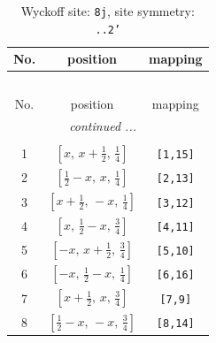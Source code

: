 \documentclass[fleqn,8pt]{jsarticle}
\begin{document}
\begin{longtable}{ccc}
\caption{Wyckoff site: {\tt 8j}, site symmetry: {\tt ..2'}}
 \\
 \hline \hline
No. & position & mapping \\ \hline \endfirsthead

\multicolumn{2}{l}{\tablename\ \thetable{}} \\
 \hline \hline
No. & position & mapping \\ \hline \endhead

 \hline \hline
\multicolumn{2}{r}{\footnotesize\it continued ...} \\ \endfoot

 \hline \hline
\multicolumn{2}{r}{} \\ \endlastfoot

1 & $\left[ x,\, x + \frac{1}{2},\, \frac{1}{4} \right]$ & {\tt [1,15]} \\ \hline
2 & $\left[ \frac{1}{2} - x,\, x,\, \frac{1}{4} \right]$ & {\tt [2,13]} \\ \hline
3 & $\left[ x + \frac{1}{2},\, - x,\, \frac{1}{4} \right]$ & {\tt [3,12]} \\ \hline
4 & $\left[ x,\, \frac{1}{2} - x,\, \frac{3}{4} \right]$ & {\tt [4,11]} \\ \hline
5 & $\left[ - x,\, x + \frac{1}{2},\, \frac{3}{4} \right]$ & {\tt [5,10]} \\ \hline
6 & $\left[ - x,\, \frac{1}{2} - x,\, \frac{1}{4} \right]$ & {\tt [6,16]} \\ \hline
7 & $\left[ x + \frac{1}{2},\, x,\, \frac{3}{4} \right]$ & {\tt [7,9]} \\ \hline
8 & $\left[ \frac{1}{2} - x,\, - x,\, \frac{3}{4} \right]$ & {\tt [8,14]} \\
\end{longtable}
\renewcommand{\arraystretch}{1.2}
\end{document}
